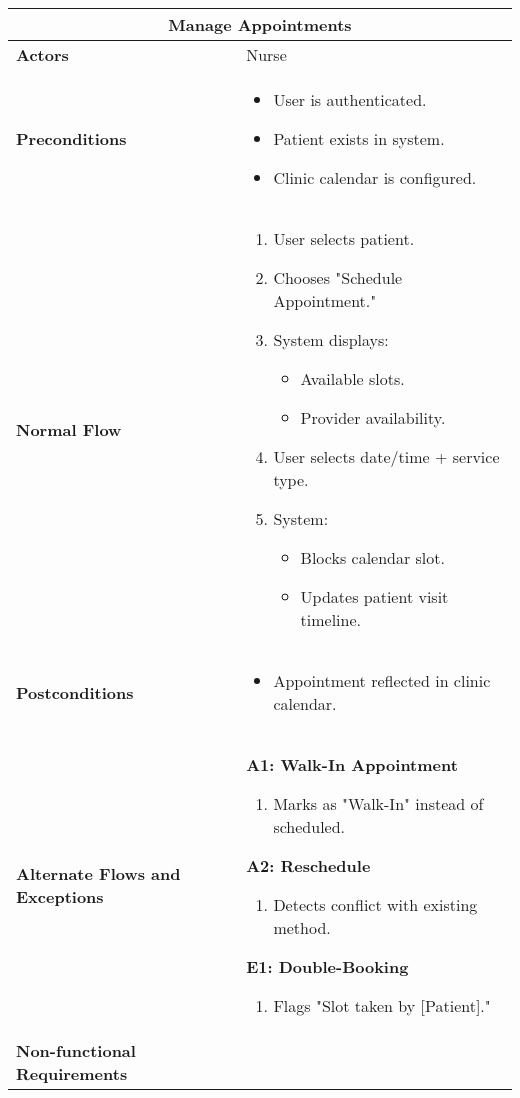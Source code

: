 \documentclass{article}
\begin{document}
\begin{longtable}{| p{5cm} | p{10cm} |}
    \hline
    \multicolumn{2}{|c|}{\textbf{Manage Appointments}} \\
    \hline
    \textbf{Actors} & Nurse \\
    \hline
    \textbf{Preconditions} & 
    \begin{itemize}
        \item User is authenticated.
        \item Patient exists in system.
        \item Clinic calendar is configured.
    \end{itemize} \\
    \hline
    \textbf{Normal Flow} & 
    \begin{enumerate}
        \item User selects patient.
        \item Chooses "Schedule Appointment."
        \item System displays:
        \begin{itemize}
            \item Available slots.
            \item Provider availability.
        \end{itemize}
        \item User selects date/time + service type.
        \item System:
        \begin{itemize}
            \item Blocks calendar slot.
            \item Updates patient visit timeline.
        \end{itemize}
    \end{enumerate} \\
    \hline
    \textbf{Postconditions} & 
    \begin{itemize}
        \item Appointment reflected in clinic calendar.
    \end{itemize} \\
    \hline
    \textbf{Alternate Flows and Exceptions} & 
    \textbf{A1: Walk-In Appointment}  
    \begin{enumerate}
        \item Marks as "Walk-In" instead of scheduled.
    \end{enumerate}

    \textbf{A2: Reschedule}  
    \begin{enumerate}
        \item Detects conflict with existing method.
    \end{enumerate}

    \textbf{E1: Double-Booking}  
    \begin{enumerate}
        \item Flags "Slot taken by [Patient]."
    \end{enumerate} \\
    \hline
    \textbf{Non-functional Requirements} &  \\
    \hline
\end{longtable}
\end{document}
